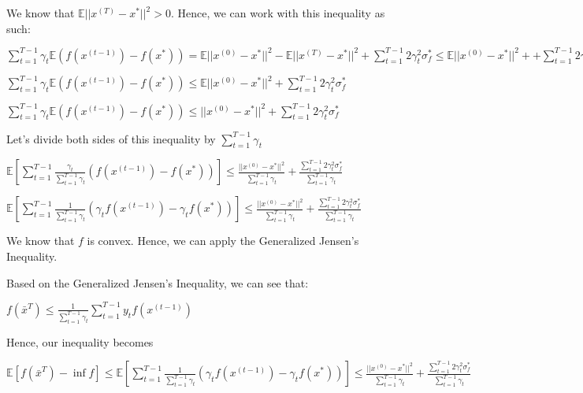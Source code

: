 We know that $\mathbb{E}||x^{(T)} - x^*||^2 > 0$. Hence, we can work with this inequality as such: \newline 

$\sum_{t=1}^{T - 1} \gamma_t \mathbb{E} (f(x^{(t - 1)}) - f(x^*)) = \mathbb{E} ||x^{(0)} - x^*||^2 - \mathbb{E}||x^{(T)} - x^*||^2 +  \sum_{t=1}^{T - 1} 2 \gamma_t^2 \sigma_f^* \leq \mathbb{E} ||x^{(0)} - x^*||^2 + +  \sum_{t=1}^{T - 1} 2 \gamma_t^2 \sigma_f^*$ \newline 

$\sum_{t=1}^{T - 1} \gamma_t \mathbb{E} (f(x^{(t - 1)}) - f(x^*)) \leq \mathbb{E} ||x^{(0)} - x^*||^2 + \sum_{t=1}^{T - 1} 2 \gamma_t^2 \sigma_f^*$ \newline 

$\sum_{t=1}^{T - 1} \gamma_t \mathbb{E} (f(x^{(t - 1)}) - f(x^*)) \leq  ||x^{(0)} - x^*||^2 +  \sum_{t=1}^{T - 1} 2 \gamma_t^2 \sigma_f^*$ \newline 

Let's divide both sides of this inequality by $\sum_{t = 1}^{T - 1} \gamma_t$ \newline 


$\mathbb{E} [\sum_{t=1}^{T - 1} \frac{\gamma_t}{\sum_{t = 1}^{T - 1} \gamma_t}  (f(x^{(t - 1)}) - f(x^*))] \leq \frac{||x^{(0)} - x^*||^2}{\sum_{t = 1}^{T - 1} \gamma_t} + \frac{\sum_{t=1}^{T - 1} 2 \gamma_t^2 \sigma_f^*}{\sum_{t = 1}^{T - 1} \gamma_t}$ \newline 

$\mathbb{E} [\sum_{t=1}^{T - 1} \frac{1}{\sum_{t = 1}^{T - 1} \gamma_t}  (\gamma_t f(x^{(t - 1)}) - \gamma_t f(x^*))] \leq \frac{||x^{(0)} - x^*||^2}{\sum_{t = 1}^{T - 1} \gamma_t} + \frac{\sum_{t=1}^{T - 1} 2 \gamma_t^2 \sigma_f^*}{\sum_{t = 1}^{T - 1} \gamma_t}$ \newline 


We know that $f$ is convex. Hence, we can apply the Generalized Jensen's Inequality. 

Based on the Generalized Jensen's Inequality, we can see that: \newline 

$f(\bar{x}^T) \leq \frac{1}{\sum_{t = 1}^{T - 1} \gamma_t} \sum_{t=1}^{T - 1} y_t f(x^{(t - 1)})$

Hence, our inequality becomes \newline 

$\mathbb{E} [f(\bar{x}^T) - \inf f] \leq \mathbb{E} [\sum_{t=1}^{T - 1} \frac{1}{\sum_{t = 1}^{T - 1} \gamma_t}  (\gamma_t f(x^{(t - 1)}) - \gamma_t f(x^*))] \leq \frac{||x^{(0)} - x^*||^2}{\sum_{t = 1}^{T - 1} \gamma_t} + \frac{\sum_{t=1}^{T - 1} 2 \gamma_t^2 \sigma_f^*}{\sum_{t = 1}^{T - 1} \gamma_t}$ \newline 

